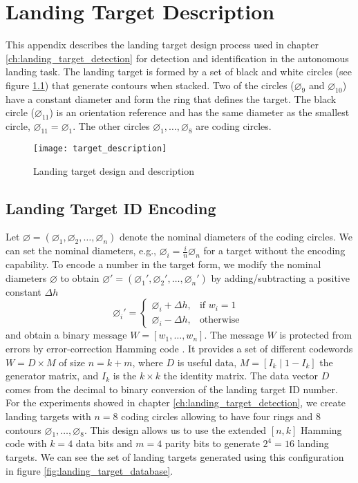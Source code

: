 
\chapter{Landing Target Description}\label{ch:target_description}
This appendix describes the landing target design process used in chapter \ref{ch:landing_target_detection} for detection and identification in the autonomous landing task. The landing target is formed by a set of black and white circles (see figure  \ref{fig:target_description}) that generate contours when stacked. Two of the circles ($\diameter_{9}$ and $\diameter_{10}$) have a constant diameter and form the ring that defines the target. The black circle ($\diameter_{11}$) is an orientation reference and has the same diameter as the smallest circle, $\diameter_{11}=\diameter_{1}$. The other circles $\diameter_{1}, \ldots, \diameter_{8}$ are coding circles.


\begin{figure}[!ht]
\centering
\texttt{[image: target\_description]}
\caption{Landing target design and description}
\label{fig:target_description}
\end{figure}

\section{Landing Target ID Encoding}
Let $\varnothing=\left( \diameter_{1}, \diameter_{2},\ldots,\diameter_{n}\right) $ denote the nominal diameters of the coding circles. We can set the nominal diameters, e.g., $\diameter_{i}=\frac{i}{n}\diameter_{n}$ for a target without the encoding capability. To encode a number in the target form, we modify the nominal diameters $\varnothing$ to obtain $\varnothing'=\left( \diameter_{1}', \diameter_{2}',\ldots,\diameter_{n}'\right) $ by adding/subtracting a positive constant $\Delta h$
\begin{equation}
\diameter_{i}'=
\begin{cases}
  \diameter_{i}+\Delta h, & \text{if } w_{i}=1 \\
  \diameter_{i}- \Delta h, & \text{otherwise }
\end{cases}
\end{equation}
and obtain a binary message  $W=[w_{1}, \dots,w_{n}]$. The message $W$ is protected from errors by error-correction Hamming code  \citep{Hamming:BSTJ:1950}. It provides a set of different codewords $W= D\times M$ of size $n=k+m$, where $D$ is useful data, $ M=[I_{k}\mid 1-I_{k}]$ the generator matrix, and $I_{k}$ is the $k\times k$ the identity matrix. The data vector $D$ comes from the decimal to binary conversion of the landing target ID number. For the experiments showed in chapter \ref{ch:landing_target_detection}, we create landing targets with $n=8$ coding circles allowing to have four rings and $8$ contours $\diameter_{1}, \ldots, \diameter_{8}$. This design allows us to use the extended $[n,k]$ Hamming code with $k=4$ data bits and $m=4$ parity bits to generate $2^{4}=16$ landing targets. We can see the set of landing targets generated using this configuration in figure \ref{fig:landing_target_database}.

